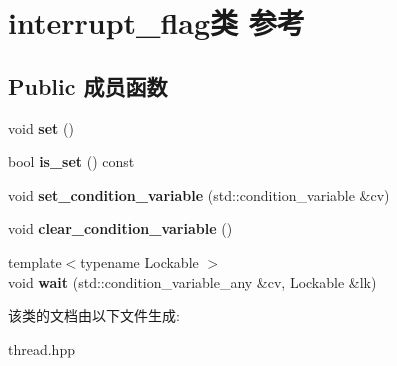 \hypertarget{classinterrupt__flag}{}\section{interrupt\+\_\+flag类 参考}
\label{classinterrupt__flag}
\subsection*{Public 成员函数}
\begin{DoxyCompactItemize}
\item 
\mbox{\label{classinterrupt__flag_a2a97873c0f9ee0ee81ee4b9f3917b274}} 
void {\bfseries set} ()
\item 
\mbox{\label{classinterrupt__flag_aee5d0cee6b88df285edaf1f418ef366e}} 
bool {\bfseries is\+\_\+set} () const
\item 
\mbox{\label{classinterrupt__flag_aef4001274efffb0ff9bcfe7c0d0f4077}} 
void {\bfseries set\+\_\+condition\+\_\+variable} (std\+::condition\+\_\+variable \&cv)
\item 
\mbox{\label{classinterrupt__flag_a9d9c6d923ff61f653697fa7bd51e2e37}} 
void {\bfseries clear\+\_\+condition\+\_\+variable} ()
\item 
\mbox{\label{classinterrupt__flag_a282e2086182e7e384898f4a170d0465b}} 
{\footnotesize template$<$typename Lockable $>$ }\\void {\bfseries wait} (std\+::condition\+\_\+variable\+\_\+any \&cv, Lockable \&lk)
\end{DoxyCompactItemize}


该类的文档由以下文件生成\+:\begin{DoxyCompactItemize}
\item 
thread.\+hpp\end{DoxyCompactItemize}
